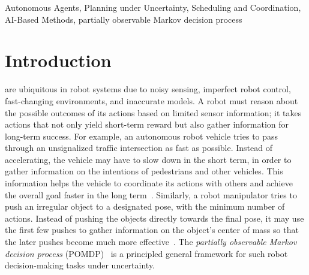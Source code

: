 \documentclass[journal]{IEEEtran}
\begin{document}
%
\begin{IEEEkeywords}
Autonomous Agents, Planning under Uncertainty, Scheduling and Coordination, AI-Based Methods, partially observable Markov decision process
\end{IEEEkeywords}

%
%
%
%
%
%
%
%
\IEEEpeerreviewmaketitle

\section{Introduction}

%
 are ubiquitous in robot systems {due to} noisy sensing, imperfect robot control,  fast-changing environments, and inaccurate models.
%
A robot must  reason about the possible outcomes
of its actions based on limited sensor information; it
takes actions that not only yield short-term reward but also  gather information
 for long-term success. For example, an autonomous robot vehicle tries to pass through an unsignalized traffic intersection as fast as possible. Instead of accelerating, the vehicle may  have to slow down in the short term, in order to gather information on the intentions of pedestrians and other vehicles. This  information helps the vehicle to coordinate its actions with others and achieve the overall goal faster  in the long term~\cite{bai2015intention,brechtel2014probabilistic}.
%
Similarly, a robot manipulator tries to push an irregular object to a designated pose, with the minimum number of actions. Instead of pushing the objects directly towards the final pose, it may use the first few pushes to gather information on the object's center of mass so that the later pushes become much more effective~\cite{koval2016pre}.
%
The \emph{partially observable Markov decision process} (POMDP)~\cite{astrom1965optimal} is a principled general  framework for such robot decision-making tasks under uncertainty.
\end{document}

